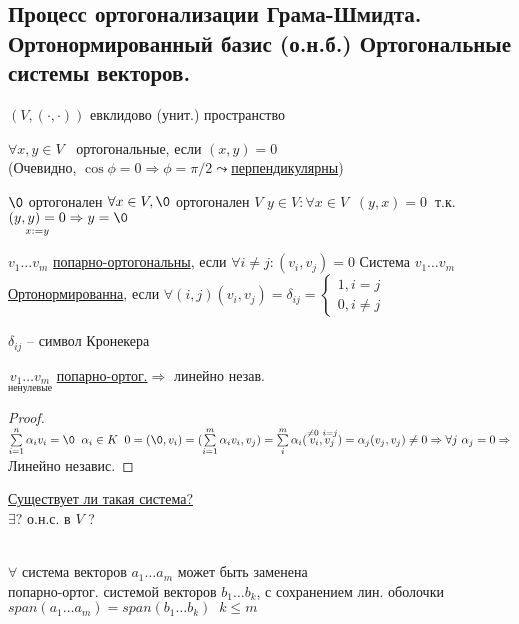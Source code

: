 \documentclass[../main.tex]{subfiles}
\begin{document}
	\subsection{Процесс ортогонализации Грама-Шмидта. Ортонормированный базис (о.н.б.) 
		Ортогональные системы векторов.}
	$(V, (\cdot, \cdot))$ евклидово (унит.) пространство
	\begin{defin}
		$\forall x, y \in V \; \; $ ортогональные, если $(x, y) = 0$ \\(Очевидно, $\cos\phi = 0 \Rightarrow \phi = \pi/2 \leadsto $\underline{перпендикулярны})
	\end{defin}
	$\0$ ортогонален $\forall x \in V, \0$ ортогонален $V$\n
	$y \in V: \forall x \in V \; \; (y, x) = 0 \; \; $т.к. $\underset{x:=y}{(y, y) = 0} \Rightarrow y = \0$
	\begin{defin}
		$v_1 \ldots v_m$ \underline{попарно-ортогональны}, если $\forall i \neq j: (v_i, v_j) = 0$\n
		Система $v_1 \ldots v_m$ \underline{Ортонормированна}, если $\forall (i, j) \boxed{(v_i, v_j) = \delta_{ij}} = \left\{\begin{array}{c}
			1, i=j\\
			0, i\neq j
		\end{array}\right.$
	\end{defin}
	$\delta_{ij}$ -- символ Кронекера
	\begin{stat}
		$\underset{\text{ненулевые}}{v_1 \ldots v_m}$ \underline{попарно-ортог.}$\Rightarrow$ линейно незав.
	\end{stat}
	\begin{proof}
		$\sum\limits_{i=1}^n \alpha_i v_i = \0 \; \; \alpha_i \in K \; \; 0 = (\0, v_i) = (\sum\limits_{i=1}^m \alpha_i v_i, v_j) = \sum\limits_{i}^m \alpha_i (\overset{\neq 0 \ i=j}{v_i, v_j}) = \alpha_j (v_j, v_j) \neq 0 \n
		\Rightarrow \forall j \ \alpha_j = 0 \Rightarrow$ Линейно независ.
	\end{proof}
	\underline{Существует ли такая система?}\\
	$\exists ?$ о.н.с. в $V$ ?
	\begin{theorem}\ \\
		$\forall$ система векторов $a_1 \ldots a_m$ может быть заменена\\
		попарно-ортог. системой векторов $b_1 \ldots b_k$, с сохранением лин. оболочки\n
		$span(a_1 \ldots a_m) = span(b_1 \ldots b_k) \; \; k \leq m$
	\end{theorem}
\end{document}
